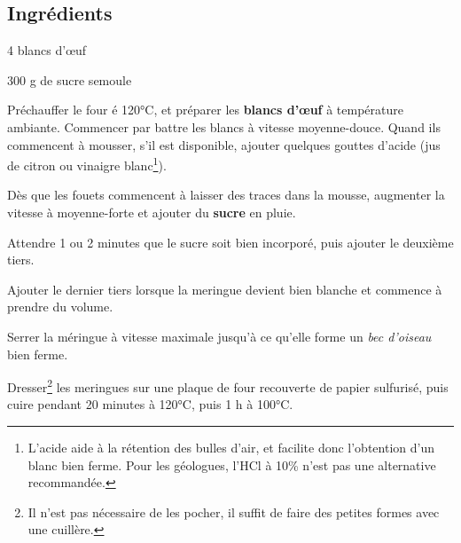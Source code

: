 \newpage
{}

\subsection*{Ingrédients}
\begin{ingredients}
	\item 4 blancs d'\oe uf
	\item 300 g de sucre semoule
\end{ingredients}

\medskip

Préchauffer le four é 120°C, et préparer les \textbf{blancs d'\oe uf} à température ambiante. 
Commencer par battre les blancs à vitesse moyenne-douce. 
Quand ils commencent à mousser, s'il est disponible, ajouter quelques gouttes d'acide (jus de citron ou vinaigre blanc\footnote{L'acide aide à la rétention des bulles d'air, et facilite donc l'obtention d'un blanc bien ferme. Pour les géologues, l'HCl à 10\% n'est pas une alternative recommandée.}).

Dès que les fouets commencent à laisser des traces dans la mousse, augmenter la vitesse à moyenne-forte et ajouter  du \textbf{sucre} en pluie.

Attendre 1 ou 2 minutes que le sucre soit bien incorporé, puis ajouter le deuxième tiers.

Ajouter le dernier tiers lorsque la meringue devient bien blanche et commence à prendre du volume.

Serrer la méringue à vitesse maximale jusqu'à ce qu'elle forme un \textit{bec d'oiseau} bien ferme.

Dresser\footnote{Il n'est pas nécessaire de les pocher, il suffit de faire des petites formes avec une cuillère.} les meringues sur une plaque de four recouverte de papier sulfurisé, puis cuire pendant 20 minutes à 120°C, puis 1 h à 100°C. 


\vspace*{0.75 cm}

\begin{recipeblock}
	\noindent 
\end{recipeblock}